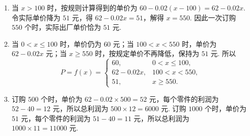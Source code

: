 \begin{solution}
\begin{enumerate}
\item 当 \(x>100\) 时，按规则计算得到的单价为 \(60-0.02(x-100)=62-0.02x\). 令实际单价降为 \(51\text{ 元}\)，得 \(62-0.02x=51\)，解得 \(x=550\). 因此一次订购 \(550\text{ 个}\)时，实际出厂单价恰为 \(51\text{ 元}\).
\item 当 \(0<x\le100\) 时，单价仍为 \(60\text{ 元}\)；当 \(100<x<550\) 时，单价为 \(62-0.02x\text{ 元}\)；当 \(x\ge550\) 时，按规定单价不再降低，保持为 \(51\text{ 元}\). 所以
\[
P=f(x)=
\begin{cases}
60, & 0<x\le100,\\
62-0.02x, & 100<x<550,\\
51, & x\ge550.
\end{cases}
\]
\item 订购 \(500\text{ 个}\)时，单价为 \(62-0.02\times500=52\text{ 元}\)，每个零件的利润为 \(52-40=12\text{ 元}\)，所以总利润为 \(500\times12=6000\text{ 元}\). 订购 \(1000\text{ 个}\)时，单价为 \(51\text{ 元}\)，每个零件的利润为 \(51-40=11\text{ 元}\)，所以总利润为 \(1000\times11=11000\text{ 元}\).
\end{enumerate}
\end{solution}

